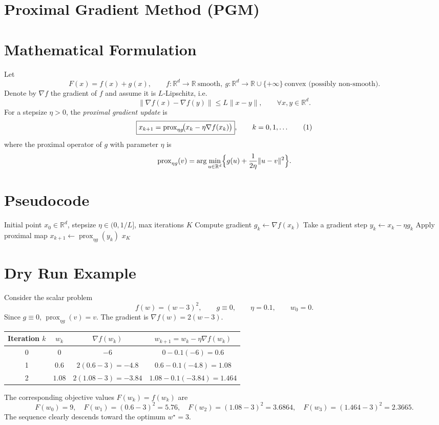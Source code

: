 \documentclass{article}
\newcommand{\prox}{\operatorname{prox}}
\newcommand{\R}{\mathbb{R}}
\begin{document}
\section*{Proximal Gradient Method (PGM)}

\section*{Mathematical Formulation}
Let 
\[
F(x)=f(x)+g(x),\qquad f:\R^{d}\to\R\ \text{smooth},\ g:\R^{d}\to\R\cup\{+\infty\}\ \text{convex (possibly non‑smooth)}.
\]
Denote by $\nabla f$ the gradient of $f$ and assume it is $L$‑Lipschitz, i.e.
\[
\|\nabla f(x)-\nabla f(y)\|\le L\|x-y\|,\qquad\forall x,y\in\R^{d}.
\]
For a stepsize $\eta>0$, the \emph{proximal gradient update} is
\begin{equation}
\boxed{%
x_{k+1}= \prox_{\eta g}\!\bigl(x_{k}-\eta\nabla f(x_{k})\bigr)},
\qquad k=0,1,\dots
\tag{1}
\end{equation}
where the proximal operator of $g$ with parameter $\eta$ is
\[
\prox_{\eta g}(v)=\arg\min_{u\in\R^{d}}\Bigl\{ g(u)+\frac{1}{2\eta}\|u-v\|^{2}\Bigr\}.
\]

\section*{Pseudocode}
\begin{algorithm}[H]
\caption{Proximal Gradient Method}
\begin{algorithmic}[1]
\Require Initial point $x_{0}\in\R^{d}$, stepsize $\eta\in(0,1/L]$, max iterations $K$
    \State Compute gradient $g_{k}\gets\nabla f(x_{k})$
    \State Take a gradient step $y_{k}\gets x_{k}-\eta g_{k}$
    \State Apply proximal map $x_{k+1}\gets\prox_{\eta g}(y_{k})$
\EndFor
\State \Return $x_{K}$
\end{algorithmic}
\end{algorithm}

\section*{Dry Run Example}
Consider the scalar problem
\[
f(w)=(w-3)^{2},\qquad g\equiv0,\qquad \eta=0.1,\qquad w_{0}=0.
\]
Since $g\equiv0$, $\prox_{\eta g}(v)=v$. The gradient is $\nabla f(w)=2(w-3)$.

\begin{center}
\begin{tabular}{c|c|c|c}
Iteration $k$ & $w_{k}$ & $\nabla f(w_{k})$ & $w_{k+1}=w_{k}-\eta\nabla f(w_{k})$\\ \hline
0 & $0$ & $-6$ & $0-0.1(-6)=0.6$\\
1 & $0.6$ & $2(0.6-3)=-4.8$ & $0.6-0.1(-4.8)=1.08$\\
2 & $1.08$ & $2(1.08-3)=-3.84$ & $1.08-0.1(-3.84)=1.464$\\
\end{tabular}
\end{center}
The corresponding objective values $F(w_{k})=f(w_{k})$ are
\[
F(w_{0})=9,\quad F(w_{1})=(0.6-3)^{2}=5.76,\quad 
F(w_{2})=(1.08-3)^{2}=3.6864,\quad 
F(w_{3})=(1.464-3)^{2}=2.3665.
\]
The sequence clearly descends toward the optimum $w^{\star}=3$.
\end{document}
